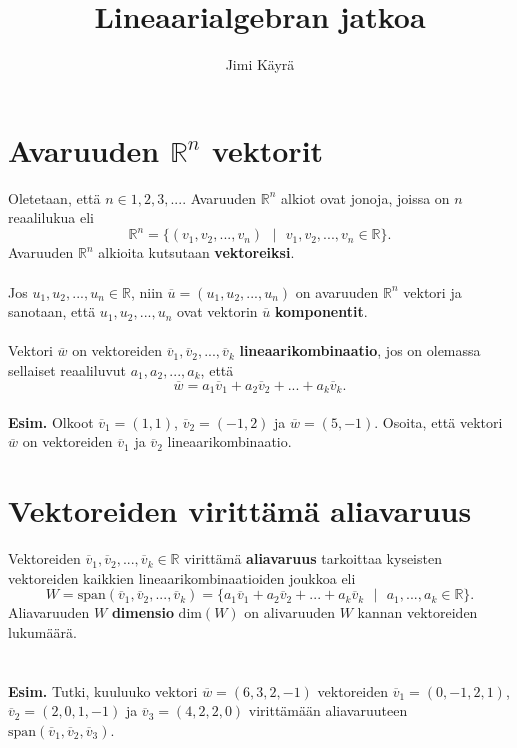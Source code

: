 \documentclass{article}
\date{}
\title{\textbf{Lineaarialgebran jatkoa}}
\author{Jimi Käyrä}
\begin{document}
\begin{titlepage}
\maketitle
\tableofcontents
\end{titlepage}

\section{Avaruuden \(\mathbb{R}^n\) vektorit}
Oletetaan, että \(n \in {1, 2, 3, ...}\). Avaruuden \(\mathbb{R}^n\) alkiot ovat jonoja, joissa on \(n\) reaalilukua eli $$\mathbb{R}^n=\{(v_1, v_2, ..., v_n) \text{ }|\text{ } v_1, v_2, ..., v_n \in \mathbb{R}\}.$$ Avaruuden \(\mathbb{R}^n\) alkioita kutsutaan \textbf{vektoreiksi}.\\
 \\
Jos \(u_1, u_2, ..., u_n \in \mathbb{R}\), niin \(\overline{u}=(u_1, u_2, ..., u_n)\) on avaruuden \(\mathbb{R}^n\) vektori ja sanotaan, että \(u_1, u_2, ..., u_n\) ovat vektorin \(\overline{u}\) \textbf{komponentit}.\\
 \\
Vektori \(\overline{w}\) on vektoreiden \(\overline{v}_1, \overline{v}_2, ..., \overline{v}_k\) \textbf{lineaarikombinaatio}, jos on olemassa sellaiset reaaliluvut \(a_1, a_2, ..., a_k\), että $$\overline{w}=a_1\overline{v}_1+a_2\overline{v}_2+ ... + a_k \overline{v}_k.$$
 \\
\textbf{Esim.} Olkoot \(\overline{v}_1=(1, 1)\), \(\overline{v}_2=(-1, 2)\) ja \(\overline{w}=(5, -1)\). Osoita, että vektori \(\overline{w}\) on vektoreiden \(\overline{v}_1\) ja \(\overline{v}_2\) lineaarikombinaatio.

\newpage
\section{Vektoreiden virittämä aliavaruus}
Vektoreiden \(\overline{v}_1, \overline{v}_2, ..., \overline{v}_k \in \mathbb{R}\) virittämä \textbf{aliavaruus} tarkoittaa kyseisten vektoreiden kaikkien lineaarikombinaatioiden joukkoa eli $$W=\text{span}(\overline{v}_1, \overline{v}_2, ..., \overline{v}_k)=\{a_1\overline{v}_1+a_2\overline{v}_2+ ... + a_k\overline{v}_k\text{ }|\text{ }a_1, ..., a_k\in \mathbb{R} \}.$$
Aliavaruuden \(W\) \textbf{dimensio} \(\text{dim}(W)\) on alivaruuden \(W\) kannan vektoreiden lukumäärä.\\
 \\
 \\
\textbf{Esim.} Tutki, kuuluuko vektori \(\overline{w}=(6, 3, 2, -1)\) vektoreiden \(\overline{v}_1=(0, -1, 2, 1)\), \(\overline{v}_2=(2, 0, 1, -1)\) ja \(\overline{v}_3=(4, 2, 2, 0)\) virittämään aliavaruuteen \(\text{span}(\overline{v}_1, \overline{v}_2, \overline{v}_3)\).
\end{document}
